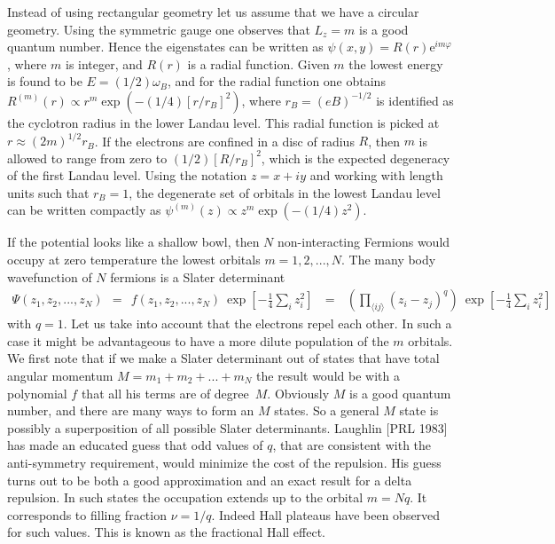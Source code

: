 \documentclass[onecolumn,fleqn]{revtex4}
\newcommand{\eexp}{\mathrm{e}^}
\newcommand{\beq}{\begin{eqnarray}}
\newcommand{\eeq}{\end{eqnarray}}
\begin{document}
Instead of using rectangular geometry let us assume that we 
have a circular geometry. Using the symmetric gauge one observes 
that ${L_z=m}$ is a good quantum number. Hence the eigenstates 
can be written as $\psi(x,y) = R(r) \eexp{im\varphi}$, 
where $m$ is integer, and $R(r)$ is a radial function.   
Given $m$ the lowest energy is found to be $E=(1/2)\omega_B$, 
and for the radial function one obtains ${R^{(m)}(r) \propto r^m \exp(-(1/4)[r/r_B]^2)}$,  
where $r_B = (eB)^{-1/2}$ is identified as the cyclotron radius in the lower Landau level.
This radial function is picked at ${r \approx (2m)^{1/2} r_B}$. 
If the electrons are confined in a disc of radius $R$, 
then $m$ is allowed to range from zero to $(1/2)[R/r_B]^2$, 
which is the expected degeneracy of the first Landau level.
Using the notation ${z=x+iy}$ and working with length units
such that ${r_B=1}$, the degenerate set of orbitals in the 
lowest Landau level can be written compactly 
as ${\psi^{(m)}(z) \propto z^m \exp(-(1/4)z^2)}$.
   

If the potential looks like a shallow bowl, then $N$ non-interacting 
Fermions would occupy at zero temperature the lowest orbitals ${m=1,2,...,N}$.    
The many body wavefunction of $N$ fermions is a Slater determinant  
\beq
\Psi(z_1,z_2,...,z_N)
\ \ = \ \ f(z_1,z_2,...,z_N) \ \exp\left[- \frac{1}{4}\sum_i z_i^2 \right]  
\ \ \ = \ \ \ \left( \prod_{\langle ij \rangle} (z_i-z_j)^q \right) \ \exp\left[- \frac{1}{4}\sum_i z_i^2 \right]  
\eeq
with $q=1$. Let us take into account that the electrons repel each other.
In such a case it might be advantageous to have a more dilute population 
of the $m$ orbitals. We first note that if we make a Slater determinant 
out of states that have total angular momentum ${M=m_1+m_2+...+m_N}$ the 
result would be with a polynomial $f$ that all his terms are of degree~$M$. 
Obviously $M$ is a good quantum number, and there are many ways to form 
an $M$ states. So a general $M$ state is possibly a superposition 
of all possible Slater determinants. Laughlin [PRL 1983] has made an 
educated guess that odd values of $q$, that are consistent with the 
anti-symmetry requirement,  would minimize the cost of the repulsion. 
His guess turns out to be both a good approximation and an exact result 
for a delta repulsion. In such states the occupation extends up to 
the orbital ${m=Nq}$. It corresponds to filling fraction ${\nu=1/q}$.
Indeed Hall plateaus have been observed for such values. This is known 
as the fractional Hall effect.  
\end{document}
